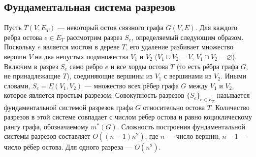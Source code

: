 \subsection{Фундаментальная система разрезов}
Пусть $T(V,E_T)$ — некоторый остов связного графа $G(V,E)$. Для каждого ребра остова $e \in E_T$ рассмотрим разрез $S_e$, определяемый следующим образом. Поскольку $e$ является мостом в дереве $T$, его удаление разбивает множество вершин $V$ на два непустых подмножества $V_1$ и $V_2$ ($V_1 \cup V_2 = V$, $V_1 \cap V_2 = \varnothing$). Включим в разрез $S_e$ само ребро $e$ и все хорды остова $T$ (то есть рёбра графа $G$, не принадлежащие $T$), соединяющие вершины из $V_1$ с вершинами из $V_2$. Иными словами, $S_e = E(V_1, V_2)$ — множество всех рёбер графа $G$ между $V_1$ и $V_2$, которое является простым разрезом. Совокупность разрезов $\{S_e\}_{e \in E_T}$ называется фундаментальной системой разрезов графа $G$ относительно остова $T$. Количество разрезов в этой системе совпадает с числом рёбер остова и равно коциклическому рангу графа, обозначаемому $m^*(G)$. Сложность построения фундаментальной системы разрезов составляет $O((n - 1)n^2)$, где $n$ — число вершин, $n - 1$ — число рёбер остова. Для одного разреза — $O(n^2)$.